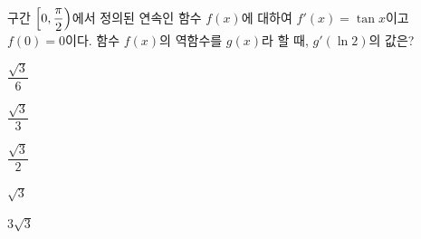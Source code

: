 구간 $\left[0{,}\mkern3mu\mathopen{}\dfrac{\pi}{2}\right)$에서 정의된 연속인 함수 $f(x)$에 대하여 $f'(x)=\tan x$이고 $f(0)=0$이다. 함수 $f(x)$의 역함수를 $g(x)$라 할 때, $g'(\ln 2)$의 값은?
\begin{choices32}{\rule[-3ex]{0pt}{8ex}$\dfrac{\sqrt{3}}{6}$}{\rule[-3ex]{0pt}{8ex}$\dfrac{\sqrt{3}}{3}$}{\rule[-3ex]{0pt}{8ex}$\dfrac{\sqrt{3}}{2}$}{\rule[-3ex]{0pt}{8ex}$\sqrt{3}$}{\rule[-3ex]{0pt}{8ex}$3\sqrt{3}$}\end{choices32}
